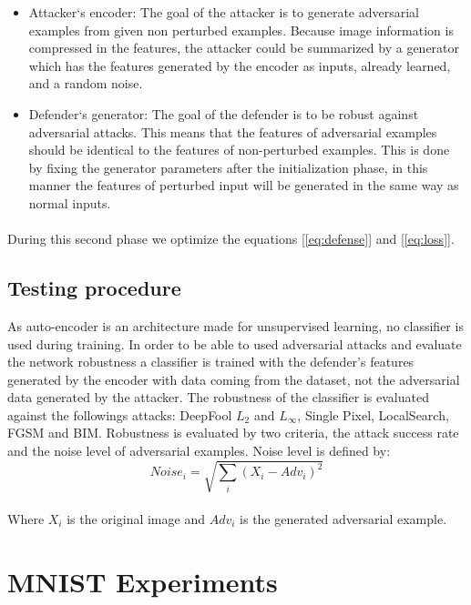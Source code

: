 \documentclass[12pt]{article}
\begin{document}
\begin{itemize}
\item Attacker‘s encoder: The goal of the attacker is to generate adversarial examples from given non perturbed examples. Because image information is compressed in the features, the attacker could be summarized by a generator which has the features generated by the encoder as inputs, already learned, and a random noise.
\item Defender‘s generator: The goal of the defender is to be robust against adversarial attacks. This means that the features of adversarial examples should be identical to the features of non-perturbed examples. This is done by fixing the generator parameters after the initialization phase, in this manner the features of perturbed input will be generated in the same way as normal inputs.
\end{itemize}

\paragraph{}
During this second phase we optimize the equations [\ref{eq:defense}] and [\ref{eq:loss}].

\subsection{Testing procedure}
As auto-encoder is an architecture made for unsupervised learning, no classifier is used during training. In order to be able to used adversarial attacks and evaluate the network robustness a classifier is trained with the defender’s features generated by the encoder with data coming from the dataset, not the adversarial data generated by the attacker. The robustness of the classifier is evaluated against the followings attacks: DeepFool $L_{2}$ and $L_{\infty}$, Single Pixel, LocalSearch, FGSM and BIM. Robustness is evaluated by two criteria, the attack success rate and the noise level of adversarial examples. Noise level is defined by:
\begin{equation}
Noise_{i} = \sqrt{\sum_{i}(X_{i} - Adv_{i})^{2}}
\end{equation}
\\
Where $X_{i}$ is the original image and $Adv_{i}$ is the generated adversarial example.

\section{MNIST Experiments}
\end{document}
